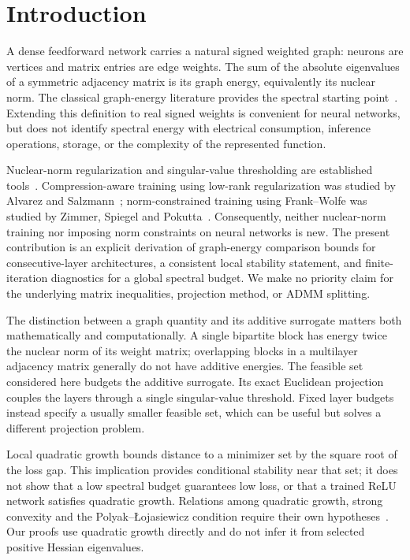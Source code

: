 \section{Introduction}\label{sec:intro}
A dense feedforward network carries a natural signed weighted graph: neurons are vertices and matrix entries are edge weights. The sum of the absolute eigenvalues of a symmetric adjacency matrix is its graph energy, equivalently its nuclear norm. The classical graph-energy literature provides the spectral starting point~\cite{Gutman2012}. Extending this definition to real signed weights is convenient for neural networks, but does not identify spectral energy with electrical consumption, inference operations, storage, or the complexity of the represented function.

Nuclear-norm regularization and singular-value thresholding are established tools~\cite{Watson1992Subdiff,Cai2010SVT}. Compression-aware training using low-rank regularization was studied by Alvarez and Salzmann~\cite{AlvarezSalzmann2017}; norm-constrained training using Frank--Wolfe was studied by Zimmer, Spiegel and Pokutta~\cite{Zimmer2022}. Consequently, neither nuclear-norm training nor imposing norm constraints on neural networks is new. The present contribution is an explicit derivation of graph-energy comparison bounds for consecutive-layer architectures, a consistent local stability statement, and finite-iteration diagnostics for a global spectral budget. We make no priority claim for the underlying matrix inequalities, projection method, or ADMM splitting.

The distinction between a graph quantity and its additive surrogate matters both mathematically and computationally. A single bipartite block has energy twice the nuclear norm of its weight matrix; overlapping blocks in a multilayer adjacency matrix generally do not have additive energies. The feasible set considered here budgets the additive surrogate. Its exact Euclidean projection couples the layers through a single singular-value threshold. Fixed layer budgets instead specify a usually smaller feasible set, which can be useful but solves a different projection problem.

Local quadratic growth bounds distance to a minimizer set by the square root of the loss gap. This implication provides conditional stability near that set; it does not show that a low spectral budget guarantees low loss, or that a trained ReLU network satisfies quadratic growth. Relations among quadratic growth, strong convexity and the Polyak--\L{}ojasiewicz condition require their own hypotheses~\cite{Karimi2016QGPL}. Our proofs use quadratic growth directly and do not infer it from selected positive Hessian eigenvalues.

